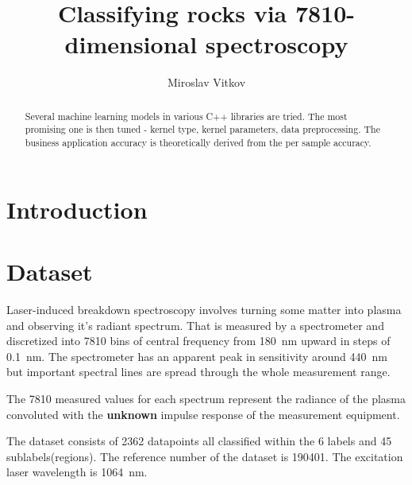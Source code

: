 \documentclass{article}
\title{Classifying rocks via 7810-dimensional spectroscopy}
\author{Miroslav Vitkov}
\begin{document}
\maketitle


\begin{abstract}
Several machine learning models in various C++ libraries are tried.
The most promising one is then tuned - kernel type, kernel parameters, data preprocessing.
The business application accuracy is theoretically derived from the per sample accuracy.
\end{abstract}


\section{Introduction}


\section{Dataset}
Laser-induced breakdown spectroscopy\cite{libs_intro} involves turning some matter into plasma and observing it's radiant spectrum.
That is measured by a spectrometer and discretized into 7810 bins of central frequency from  \SI{180}{\nano\metre} upward in steps of \SI{0.1}{\nano\metre}.
The spectrometer has an apparent peak in sensitivity around \SI{440}{\nano\metre} but important spectral lines are spread through the whole measurement range.
\par
The 7810 measured values for each spectrum represent the radiance\cite{radiance} of the plasma convoluted with the \textbf{unknown} impulse response of the measurement equipment.
\par
The dataset consists of 2362 datapoints all classified within the 6 labels and 45 sublabels(regions).
The reference number of the dataset is 190401.
The excitation laser wavelength is \SI{1064}{\nano\metre}.
\end{document}
